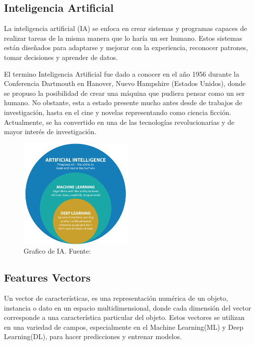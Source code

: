 

\subsection{Inteligencia Artificial}
La inteligencia artificial (IA) se enfoca en crear sistemas y programas capaces de realizar tareas de la misma manera que lo haría un ser humano. Estos sistemas están diseñados para adaptarse y mejorar con la experiencia, reconocer patrones, tomar decisiones y aprender de datos. 

El termino Inteligencia Artificial fue dado a conocer en el año 1956 durante la Conferencia Dartmouth en Hanover, Nuevo Hampshire (Estados Unidos), donde se propuso la posibilidad de crear una máquina que pudiera pensar como un ser humano.  No obstante, esta a estado presente mucho antes desde de trabajos de investigación, hasta en el cine y novelas representando como ciencia ficción. 
Actualmente, se ha convertido en una de las tecnologías revolucionarias y de mayor interés de investigación.


\begin{figure}[h]
	\begin{center}
		\includegraphics[width=0.5\textwidth]{2/figuras/imagenes/IA_ML_DL.png}
		\caption{Grafico de IA. Fuente: \cite{IA_}}
		\label{1:fig 16}
	\end{center}
\end{figure}

\subsection{Features Vectors}
Un vector de características, es una representación numérica de un objeto, instancia o dato en un espacio multidimensional, donde cada dimensión del vector corresponde a una característica particular del objeto. Estos vectores se utilizan en una variedad de campos, especialmente en el Machine Learning(ML) y Deep Learning(DL), para hacer predicciones y entrenar modelos.


